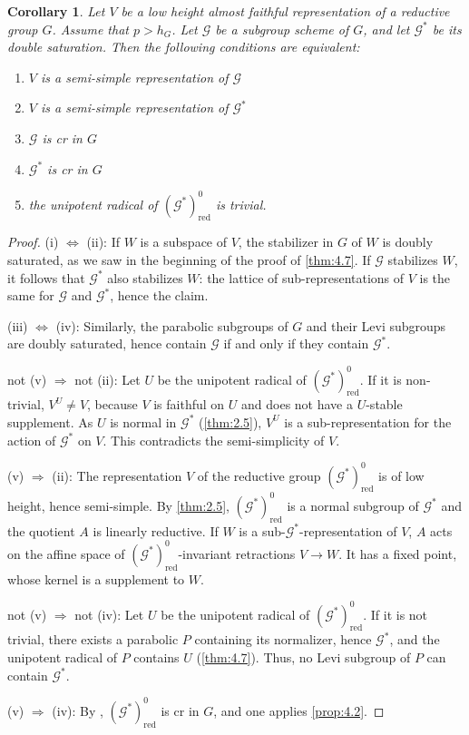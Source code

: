 \documentclass[11pt,a4paper]{article}
\theoremstyle{plain}
\newtheorem{corollary}[theorem]{Corollary}
\theoremstyle{definition}
\newcommand{\red}{\mathrm{red}}
\begin{document}
\begin{corollary} \label{cor:4.11}
Let $V$ be a low height almost faithful representation of a reductive group $G$. Assume that $p > h_G$. Let $\mathcal{G}$ be a subgroup scheme of $G$, and let $\mathcal{G}^*$ be its double saturation. Then the following conditions are equivalent:
\begin{enumerate}
\item[(i)] $V$ is a semi-simple representation of $\mathcal{G}$
\item[(ii)] $V$ is a semi-simple representation of $\mathcal{G}^*$
\item[(iii)] $\mathcal{G}$ is cr in $G$
\item[(iv)] $\mathcal{G}^*$ is cr in $G$
\item[(v)] the unipotent radical of $(\mathcal{G}^*)^0_\red$ is trivial.
\end{enumerate}
\end{corollary}

\begin{proof}
(i) $\Leftrightarrow$ (ii): If $W$ is a subspace of $V$, the stabilizer in $G$ of $W$ is doubly saturated, as we saw in the beginning of the proof of \ref{thm:4.7}. If $\mathcal{G}$ stabilizes $W$, it follows that $\mathcal{G}^*$ also stabilizes $W$: the lattice of sub-representations of $V$ is the same for $\mathcal{G}$ and $\mathcal{G}^*$, hence the claim.

(iii) $\Leftrightarrow$ (iv): Similarly, the parabolic subgroups of $G$ and their Levi subgroups are doubly saturated, hence contain $\mathcal{G}$ if and only if they contain $\mathcal{G}^*$.

not (v) $\Rightarrow$ not (ii): Let $U$ be the unipotent radical of $(\mathcal{G}^*)^0_\red$. If it is non-trivial, $V^U \neq V$, because $V$ is faithful on $U$ and does not have a $U$-stable supplement. As $U$ is normal in $\mathcal{G}^*$ (\ref{thm:2.5}), $V^U$ is a sub-representation for the action of $\mathcal{G}^*$ on $V$. This contradicts the semi-simplicity of $V$.

(v) $\Rightarrow$ (ii): The representation $V$ of the reductive group $(\mathcal{G}^*)^0_\red$ is of low height, hence semi-simple. By \ref{thm:2.5}, $(\mathcal{G}^*)^0_\red$ is a normal subgroup of $\mathcal{G}^*$ and the quotient $A$ is linearly reductive. If $W$ is a sub-$\mathcal{G}^*$-representation of $V$, $A$ acts on the affine space of $(\mathcal{G}^*)^0_\red$-invariant retractions $V \to W$. It has a fixed point, whose kernel is a supplement to $W$.

not (v) $\Rightarrow$ not (iv): Let $U$ be the unipotent radical of $(\mathcal{G}^*)^0_\red$. If it is not trivial, there exists a parabolic $P$ containing its normalizer, hence $\mathcal{G}^*$, and the unipotent radical of $P$ contains $U$ (\ref{thm:4.7}). Thus, no Levi subgroup of $P$ can contain $\mathcal{G}^*$.

(v) $\Rightarrow$ (iv): By \cite[Theorem~7, page~26]{S2}, $(\mathcal{G}^*)^0_\red$ is cr in $G$, and one applies \ref{prop:4.2}. \qedhere
\end{proof}
\end{document}
